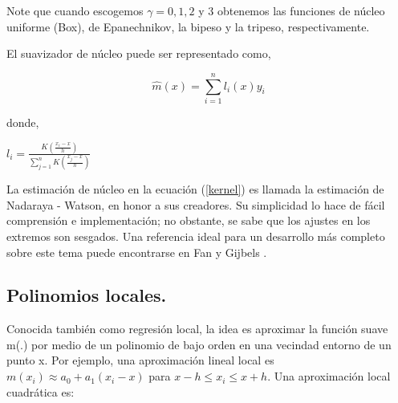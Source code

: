 \hspace*{0.4 cm} Note que cuando escogemos $\gamma = 0, 1, 2$ y $3$ obtenemos las funciones de n\'ucleo uniforme (Box), de Epanechnikov, la bipeso y la tripeso, respectivamente.

\hspace*{0.4 cm} El suavizador de n\'ucleo puede ser representado como,

\vspace*{0.2 cm}


\begin{equation}
\hat{m}(x) = \sum_{i=1}^{n} l_{i}(x) y_{i} 
\label{kernel1}
\end{equation}

\vspace*{0.2 cm}

\noindent donde,

\vspace*{0.2 cm}

\begin{center}
$\displaystyle{l_{i} = \frac{K(\frac{x_{i}-x}{h})}{\sum_{j=1}^{n} K(\frac{x_{j}-x}{h})} }$
\end{center}

\vspace*{0.2 cm}


\hspace*{0.4 cm} La estimaci\'on de n\'ucleo en la ecuaci\'on (\ref{kernel}) es llamada la estimaci\'on de Nadaraya - Watson, en honor a sus creadores. Su simplicidad lo hace de f\'acil comprensi\'on e implementaci\'on; no obstante, se sabe que los ajustes en los extremos son sesgados. Una referencia ideal para un desarrollo m\'as completo sobre este tema puede encontrarse en Fan y Gijbels \cite{FG}.

\subsection{Polinomios locales.\\}



\hspace*{0.4 cm} Conocida tambi\'en como regresi\'on local, la idea es aproximar la funci\'on suave m(.) por medio de un polinomio de bajo orden en una vecindad entorno de un punto x. Por ejemplo, una aproximaci\'on lineal local es $m(x_{i}) \approx a_{0} + a_{1}(x_{i}-x)$ para $x - h \leq x_{i} \leq x+h$. Una aproximaci\'on local cuadr\'atica es:

\vspace*{0.2 cm}


